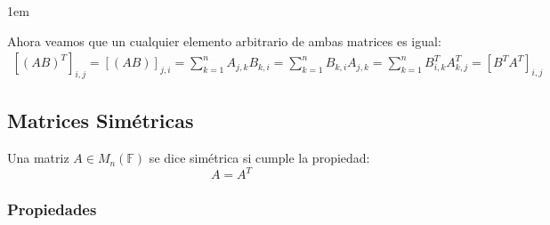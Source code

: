 \documentclass[12pt]{report}                                    %
\newenvironment{SmallIndentation}[1][0.75em]                    %
    {\begin{adjustwidth}{#1}{}\begin{footnotesize}}                 %
    {\end{footnotesize}\end{adjustwidth}}                           %
\begin{document}
\begin{itemize}
\begin{SmallIndentation}[1em]
                            Ahora veamos que un cualquier elemento arbitrario de ambas matrices es igual:
                            \begin{equation*}
                            \begin{split}
                                [(AB)^T]_{i, j}     
                                    = [(AB)]_{j, i} = \sum_{k=1}^{n} A_{j, k}B_{k, i} 
                                    = \sum_{k=1}^{n} B_{k, i} A_{j, k}   
                                    = \sum_{k=1}^{n} B^T_{i, k} A^T_{k, j}            
                                = [B^T A^T]_{i, j}
                            \end{split}
                            \end{equation*}

                        \end{SmallIndentation}

                \end{itemize}


                        
            \clearpage
            \subsection{Matrices Simétricas}

                Una matriz $A \in M_{n}(\mathbb{F})$ se dice simétrica si cumple la propiedad:
                \begin{equation}
                    A = A^T
                \end{equation}

                \subsubsection{Propiedades}
\end{document}
